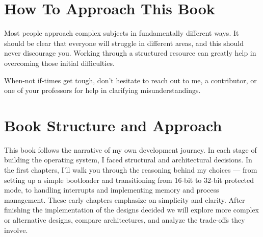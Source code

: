 \section{How To Approach This Book}

Most people approach complex subjects in fundamentally different ways. It should be clear that everyone 
will struggle in different areas, and this should never discourage you. Working through a structured 
resource can greatly help in overcoming those initial difficulties.

When-not if-times get tough, don't hesitate to reach out to me, a contributor, or one of your professors 
for help in clarifying misunderstandings.

\section{Book Structure and Approach}

This book follows the narrative of my own development journey. In each stage of building the operating 
system, I faced structural and architectural decisions. In the first chapters, I'll walk you through 
the reasoning behind my choices — from setting up a simple bootloader and transitioning from 16-bit to 
32-bit protected mode, to handling interrupts and implementing memory and process management. These early 
chapters emphasize on simplicity and clarity. After finishing the implementation of the designs decided we 
will explore more complex or alternative designs, compare architectures, and analyze the trade-offs they involve.
